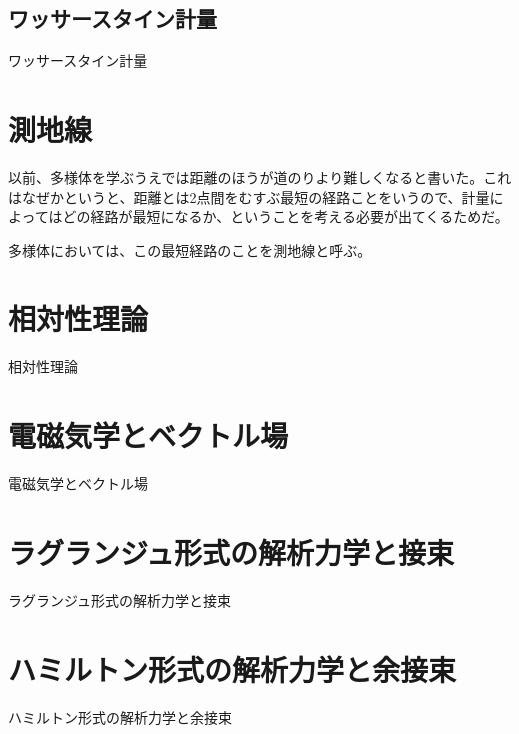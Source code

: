 \newpage


\subsection{ ワッサースタイン計量 }

ワッサースタイン計量

\newpage


\section{ 測地線 }

以前、多様体を学ぶうえでは距離のほうが道のりより難しくなると書いた。これはなぜかというと、距離とは2点間をむすぶ最短の経路ことをいうので、計量によってはどの経路が最短になるか、ということを考える必要が出てくるためだ。

多様体においては、この最短経路のことを測地線と呼ぶ。

\newpage


\section{ 相対性理論 }

相対性理論

\newpage


\section{ 電磁気学とベクトル場 }

電磁気学とベクトル場

\newpage


\section{ ラグランジュ形式の解析力学と接束 }

ラグランジュ形式の解析力学と接束

\newpage


\section{ ハミルトン形式の解析力学と余接束 }

ハミルトン形式の解析力学と余接束

\newpage
